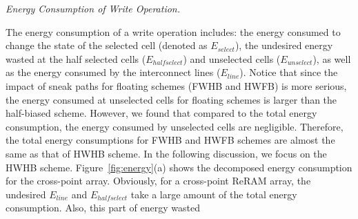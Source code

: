 \vspace{6pt} \emph{Energy Consumption of Write Operation.} \vspace{2pt}

The energy consumption of a write operation includes: the energy consumed
to change the state of the selected cell (denoted as $E_{select}$), the
undesired energy wasted at the half selected cells ($E_{halfselect}$) and
unselected cells ($E_{unselect}$), as well as the energy consumed by the
interconnect lines ($E_{line}$). Notice that since the impact of sneak
paths for floating schemes (FWHB and HWFB) is more serious, the energy
consumed at unselected cells for floating schemes is larger than the
half-biased scheme. However, we found that compared to the total energy
consumption, the energy consumed by unselected cells are negligible.
Therefore, the total energy consumptions for FWHB and HWFB schemes are
almost the same as that of HWHB scheme. In the following discussion, we
focus on the HWHB scheme. Figure~\ref{fig:energy}(a) shows the decomposed
energy consumption for the cross-point array. Obviously, for a cross-point
ReRAM array, the undesired $E_{line}$ and $E_{halfselect}$ take a large
amount of the total energy consumption. Also, this part of energy wasted
